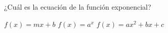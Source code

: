
\question ¿Cuál es la ecuación de la función exponencial?

  \begin{oneparchoices}
    \choice $f(x) = mx + b$
    \CorrectChoice $f(x) = a^x$
    \choice $f(x) = ax^2 + bx + c$
  \end{oneparchoices}
